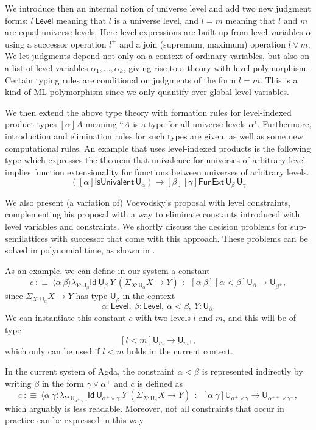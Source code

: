 \documentclass[11pt,a4paper]{article}
\theoremstyle{definition}
\newcommand{\Id}{\mathsf{Id}}
\newcommand{\lam}[2]{{\langle}#1{\rangle}#2}
\def\UU{\mathsf{U}}
\def\Level{\mathsf{Level}}
\begin{document}
  We introduce then an internal notion of universe level and
  add two new judgment forms: $l\ \Level$ meaning that $l$ is a universe level, 
  and $l = m$ meaning that $l$ and $m$ are equal universe levels. 
  Here level expressions are built up from level variables $\alpha$ 
  using a successor operation $l^+$ and 
  a join (supremum, maximum) operation $l \vee m$.
  We let judgments depend not only on a context of ordinary variables, 
  but also on a list of level variables $\alpha_1, \ldots, \alpha_k$, 
  giving rise to a theory with level polymorphism.
  Certain typing rules are conditional on judgments of the form $l=m$. 
  This is a kind of ML-polymorphism since we only quantify over global level variables. 
  
  We then extend the above type theory with formation rules for level-indexed product 
  types $[\alpha]A$ meaning ``$A$ is a type for all universe levels $\alpha$".
  Furthermore, introduction and elimination rules for such types are given,
  as well as some new computational rules. An example that uses level-indexed products 
  is the following type which  expresses the theorem that univalence for universes 
  of arbitrary level implies function extensionality for functions between 
  universes of arbitrary levels.
$$
([\alpha]\mathsf{IsUnivalent}\, \UU_\alpha)
\to [\beta][\gamma] \mathsf{FunExt}\, \UU_\beta\, \UU_\gamma
$$

We also present (a variation of) Voevodsky's proposal \cite{VV} with level constraints,
complementing his proposal with a way to eliminate 
constants introduced with level variables and constraints.
  We shortly discuss the decision problems for sup-semilattices with
  successor that come with this approach. These problems can be solved 
  in polynomial time, as shown in \cite{bezem-coquand:lattices}.
  
  \medskip
  
As an example, we can define in our system a constant
$$
c~:\equiv~\lam{\alpha~\beta}\lambda_{Y:\UU_{\beta}}\Id~{\UU_{\beta}}~Y~ (\Sigma_{X:\UU_{\alpha}}X\rightarrow Y)~~:~~
   [\alpha~\beta][\alpha<\beta]\UU_{\beta} \rightarrow \UU_{\beta^+},
$$
since $\Sigma_{X:\UU_{\alpha}}X\rightarrow Y$ has type $\UU_{\beta}$ in the context
   $$\alpha:\Level,~\beta:\Level,~\alpha<\beta,~Y:\UU_{\beta}.$$
We can instantiate this constant $c$ with two levels $l$ and $m$, 
   and this will be of type
   $$[l<m]\UU_{m} \rightarrow \UU_{m^+},$$
which only can be used if $l<m$ holds in the current context.

   \medskip

In the current system of Agda, the constraint $\alpha<\beta$ is represented indirectly by
writing $\beta$ in the form $\gamma\vee \alpha^+$ and $c$ is defined as
$$
c~:\equiv~\lam{\alpha~\gamma}\lambda_{Y:\UU_{\alpha^+\vee\gamma}}\Id~{\UU_{\alpha^+\vee\gamma}}~Y~ (\Sigma_{X:\UU_{\alpha}}X\rightarrow Y)~~:~~
   [\alpha~\gamma]\UU_{\alpha^+\vee\gamma} \rightarrow \UU_{\alpha^{++}\vee\gamma^+},
$$
   which arguably is less readable. Moreover, not all constraints that occur in practice
   can be expressed in this way.




\end{document}
